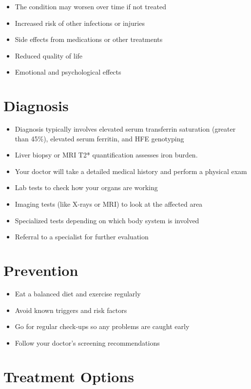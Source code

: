 \begin{itemize}[noitemsep]
  \item The condition may worsen over time if not treated
  \item Increased risk of other infections or injuries
  \item Side effects from medications or other treatments
  \item Reduced quality of life
  \item Emotional and psychological effects
\end{itemize}

\section{Diagnosis}

\begin{itemize}[noitemsep]
  \item Diagnosis typically involves elevated serum transferrin saturation (greater than 45\%), elevated serum ferritin, and HFE genotyping
  \item Liver biopsy or MRI T2* quantification assesses iron burden.
  \item Your doctor will take a detailed medical history and perform a physical exam
  \item Lab tests to check how your organs are working
  \item Imaging tests (like X-rays or MRI) to look at the affected area
  \item Specialized tests depending on which body system is involved
  \item Referral to a specialist for further evaluation
\end{itemize}

\section{Prevention}

\begin{itemize}[noitemsep]
  \item Eat a balanced diet and exercise regularly
  \item Avoid known triggers and risk factors
  \item Go for regular check-ups so any problems are caught early
  \item Follow your doctor's screening recommendations
\end{itemize}

\section{Treatment Options}

